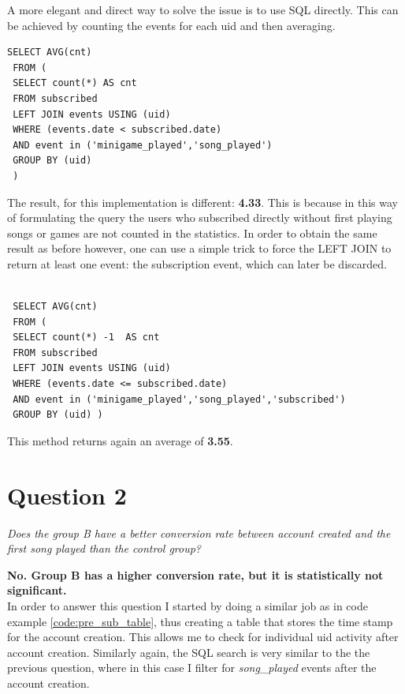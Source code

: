 \documentclass[paper=a4, fontsize=10pt]{report}
\begin{document}
A more elegant and direct way to solve the issue is to use SQL directly. This can be achieved by
counting the events for each uid and then averaging.

\footnotesize
\begin{lstlisting}[frame=single,caption=Return SQL average \label{code:sql_average_table}]
 SELECT AVG(cnt)
 FROM (  
 SELECT count(*) AS cnt
 FROM subscribed 
 LEFT JOIN events USING (uid)
 WHERE (events.date < subscribed.date)
 AND event in ('minigame_played','song_played') 
 GROUP BY (uid)
 )
\end{lstlisting}
\normalsize

The result, for this implementation is different: \textbf{4.33}. This is because in this way of
formulating the query the users who subscribed directly without first playing songs or 
games are not counted in the statistics. In order to obtain the same result as before however, 
one can use a simple trick to force the LEFT JOIN to return at least one event: the subscription event, which can 
later be discarded.

\footnotesize
\begin{lstlisting}[frame=single,caption=Return SQL average - Fixed \label{code:sql_average_fixed_table}]

 SELECT AVG(cnt)
 FROM ( 
 SELECT count(*) -1  AS cnt
 FROM subscribed 
 LEFT JOIN events USING (uid)
 WHERE (events.date <= subscribed.date)
 AND event in ('minigame_played','song_played','subscribed') 
 GROUP BY (uid) )
\end{lstlisting}
\normalsize
This method returns again an average of \textbf{3.55}.


\section*{Question 2}

\textit{Does the group B have a better conversion rate between account created and
the first song played than the control group?}

\textbf{No. Group B has a higher conversion rate, but it is statistically not significant. }\\

In order to answer this question I started by doing a similar job as in code example \ref{code:pre_sub_table}, thus creating a table that stores the time stamp
for the account creation. This allows me to check for individual uid activity after account creation. Similarly again, the SQL search is very similar to the 
the previous question, where in this case I filter for \textit{song\_played} events after the account creation.
\end{document}
